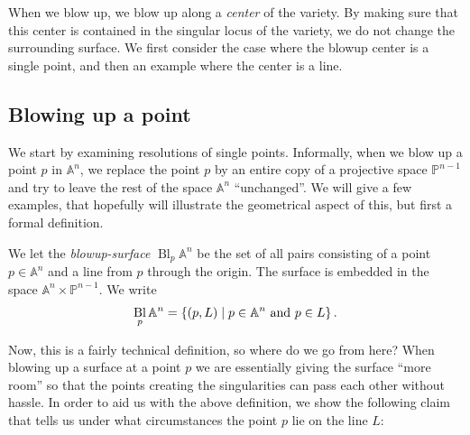 \documentclass{article}
\newcommand{\A}{\ensuremath{\mathbb{A}}}
\renewcommand{\P}{\ensuremath{\mathbb{P}}}
\DeclareMathOperator{\Bl}{Bl}
\begin{document}
    When we blow up, we blow up along a \emph{center} of the variety. By making
    sure that this center is contained in the singular locus of the variety, we
    do not change the surrounding surface. We first consider the case where the
    blowup center is a single point, and then an example where the center is a
    line.

    \subsection{Blowing up a point}
    \label{sub:blowing_up_a_point_singularity_}
    
    We start by examining resolutions of single points. Informally, when we
    blow up a point $p$ in $\A^n$, we replace the point $p$ by an entire copy
    of a projective space $\P^{n-1}$ and try to leave the rest of the space
    $\A^n$ ``unchanged''. We will
    give a few examples, that hopefully will illustrate the geometrical aspect
    of this, but first a formal definition.

    \begin{definition}[Blowup of $\A^{n}$ at a point $p$.]
        We let the \emph{blowup-surface}
        $\Bl_p\A^{n}$ be the set of all pairs consisting of a point $p \in
        \A^n$ and a line from $p$ through the origin. The surface is embedded
        in the space $\A^n\times\P^{n-1}$. We write
        \begin{equation}
            \notag
            \Bl_p\A^n = \left\{ (p, L) \mid p \in \A^{n} \text{ and } p \in L \right\}.
        \end{equation}
    \end{definition}
    Now, this is a fairly technical definition, so where do we go from here?
    When blowing up a surface at a point $p$ we are essentially giving the
    surface ``more room'' so that the points creating the singularities can
    pass each other without hassle. In order to aid us with the above
    definition, we show the following claim that tells us under what
    circumstances the point $p$ lie on the line $L$:
\end{document}
